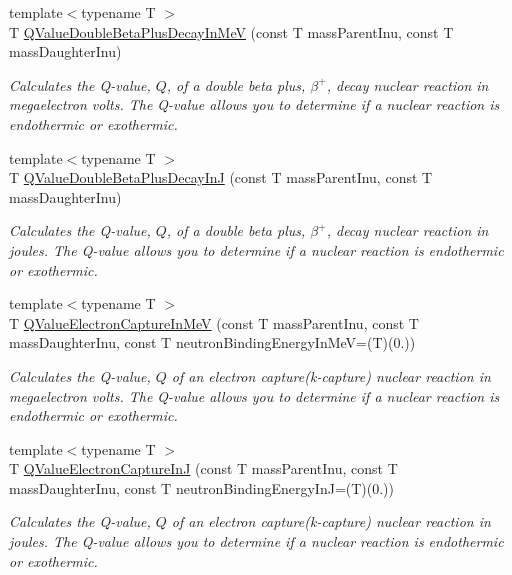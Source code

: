 \begin{DoxyCompactItemize}
{\footnotesize template$<$typename T $>$ }\\T \mbox{\hyperlink{group___e_g_x_phys-_q_value-_beta_plus_gab78be314eac63ddbce441b4c8b22b47d}{Q\+Value\+Double\+Beta\+Plus\+Decay\+In\+MeV}} (const T mass\+Parent\+Inu, const T mass\+Daughter\+Inu)
\begin{DoxyCompactList}\small\item\em Calculates the Q-\/value, $Q$, of a double beta plus, $\beta^+$, decay nuclear reaction in megaelectron volts. The Q-\/value allows you to determine if a nuclear reaction is endothermic or exothermic. \end{DoxyCompactList}\item 
{\footnotesize template$<$typename T $>$ }\\T \mbox{\hyperlink{group___e_g_x_phys-_q_value-_beta_plus_ga3531ffda0c561a601a61f54f5c7780df}{Q\+Value\+Double\+Beta\+Plus\+Decay\+InJ}} (const T mass\+Parent\+Inu, const T mass\+Daughter\+Inu)
\begin{DoxyCompactList}\small\item\em Calculates the Q-\/value, $Q$, of a double beta plus, $\beta^+$, decay nuclear reaction in joules. The Q-\/value allows you to determine if a nuclear reaction is endothermic or exothermic. \end{DoxyCompactList}\item 
{\footnotesize template$<$typename T $>$ }\\T \mbox{\hyperlink{group___e_g_x_phys-_q_value-_electron_capture_ga9cd8502b6101614c17114e9710cdcf6c}{Q\+Value\+Electron\+Capture\+In\+MeV}} (const T mass\+Parent\+Inu, const T mass\+Daughter\+Inu, const T neutron\+Binding\+Energy\+In\+MeV=(T)(0.))
\begin{DoxyCompactList}\small\item\em Calculates the Q-\/value, $Q$ of an electron capture(k-\/capture) nuclear reaction in megaelectron volts. The Q-\/value allows you to determine if a nuclear reaction is endothermic or exothermic. \end{DoxyCompactList}\item 
{\footnotesize template$<$typename T $>$ }\\T \mbox{\hyperlink{group___e_g_x_phys-_q_value-_electron_capture_gaf2569f9c706130b730dcf55695780263}{Q\+Value\+Electron\+Capture\+InJ}} (const T mass\+Parent\+Inu, const T mass\+Daughter\+Inu, const T neutron\+Binding\+Energy\+InJ=(T)(0.))
\begin{DoxyCompactList}\small\item\em Calculates the Q-\/value, $Q$ of an electron capture(k-\/capture) nuclear reaction in joules. The Q-\/value allows you to determine if a nuclear reaction is endothermic or exothermic. \end{DoxyCompactList}\item 

\end{DoxyCompactItemize}

